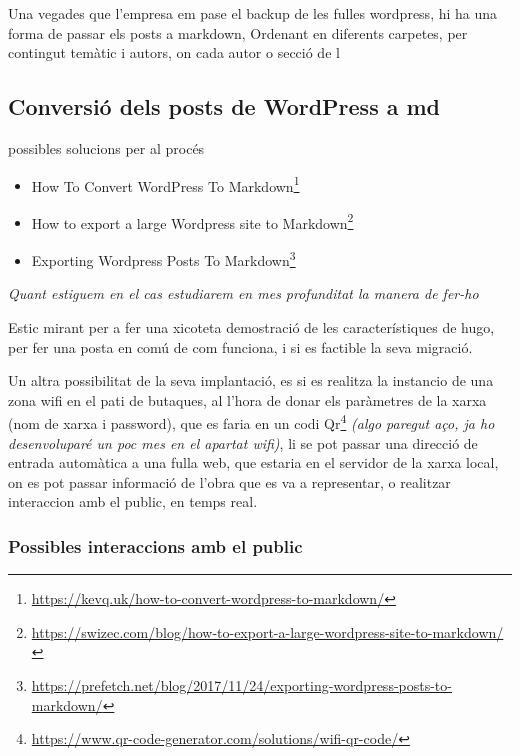 \documentclass[
  10pt,
]{book}
\DeclareRobustCommand{\href}[2]{#2\footnote{\url{#1}}}
\providecommand{\tightlist}{%
  \setlength{\itemsep}{0pt}\setlength{\parskip}{0pt}}
\begin{document}
Una vegades que l'empresa em pase el backup de les fulles wordpress, hi ha una forma de passar els posts a markdown,
Ordenant en diferents carpetes, per contingut temàtic i autors, on cada autor o secció de l

\hypertarget{conversiuxf3-dels-posts-de-wordpress-a-md}{%
\subsection{Conversió dels posts de WordPress a md}\label{conversiuxf3-dels-posts-de-wordpress-a-md}}

possibles solucions per al procés

\begin{itemize}
\tightlist
\item
  \href{https://kevq.uk/how-to-convert-wordpress-to-markdown/}{How To Convert WordPress To Markdown}
\item
  \href{https://swizec.com/blog/how-to-export-a-large-wordpress-site-to-markdown/}{How to export a large Wordpress site to Markdown}
\item
  \href{https://prefetch.net/blog/2017/11/24/exporting-wordpress-posts-to-markdown/}{Exporting Wordpress Posts To Markdown}
\end{itemize}

\emph{Quant estiguem en el cas estudiarem en mes profunditat la manera de fer-ho}

Estic mirant per a fer una xicoteta demostració de les característiques de hugo, per fer una posta en comú de com funciona, i si es factible la seva migració.

Un altra possibilitat de la seva implantació, es si es realitza la instancio de una zona wifi en el pati de butaques, al l'hora de donar els paràmetres de la xarxa (nom de xarxa i password), que es faria en un codi \href{https://www.qr-code-generator.com/solutions/wifi-qr-code/}{Qr} \emph{(algo paregut aço, ja ho desenvoluparé un poc mes en el apartat wifi)}, li se pot passar una direcció de entrada automàtica a una fulla web, que estaria en el servidor de la xarxa local, on es pot passar informació de l'obra que es va a representar, o realitzar interaccion amb el public, en temps real.

\hypertarget{possibles-interaccions-amb-el-public}{%
\subsubsection{Possibles interaccions amb el public}\label{possibles-interaccions-amb-el-public}}
\end{document}
